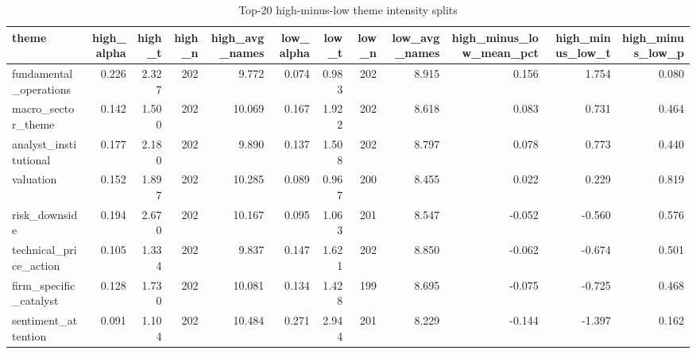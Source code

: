 \begin{table}[!htbp]\centering
\caption{Top-20 high-minus-low theme intensity splits}
\label{tab:deep_theme_intensity}
\begin{tabular}{lrrrrrrrrrrr}
\toprule
theme & high\_alpha & high\_t & high\_n & high\_avg\_names & low\_alpha & low\_t & low\_n & low\_avg\_names & high\_minus\_low\_mean\_pct & high\_minus\_low\_t & high\_minus\_low\_p \\
\midrule
fundamental\_operations & 0.226 & 2.327 & 202 & 9.772 & 0.074 & 0.983 & 202 & 8.915 & 0.156 & 1.754 & 0.080 \\
macro\_sector\_theme & 0.142 & 1.500 & 202 & 10.069 & 0.167 & 1.922 & 202 & 8.618 & 0.083 & 0.731 & 0.464 \\
analyst\_institutional & 0.177 & 2.180 & 202 & 9.890 & 0.137 & 1.508 & 202 & 8.797 & 0.078 & 0.773 & 0.440 \\
valuation & 0.152 & 1.897 & 202 & 10.285 & 0.089 & 0.967 & 200 & 8.455 & 0.022 & 0.229 & 0.819 \\
risk\_downside & 0.194 & 2.670 & 202 & 10.167 & 0.095 & 1.063 & 201 & 8.547 & -0.052 & -0.560 & 0.576 \\
technical\_price\_action & 0.105 & 1.334 & 202 & 9.837 & 0.147 & 1.621 & 202 & 8.850 & -0.062 & -0.674 & 0.501 \\
firm\_specific\_catalyst & 0.128 & 1.730 & 202 & 10.081 & 0.134 & 1.428 & 199 & 8.695 & -0.075 & -0.725 & 0.468 \\
sentiment\_attention & 0.091 & 1.104 & 202 & 10.484 & 0.271 & 2.944 & 201 & 8.229 & -0.144 & -1.397 & 0.162 \\
\bottomrule
\end{tabular}
\end{table}
